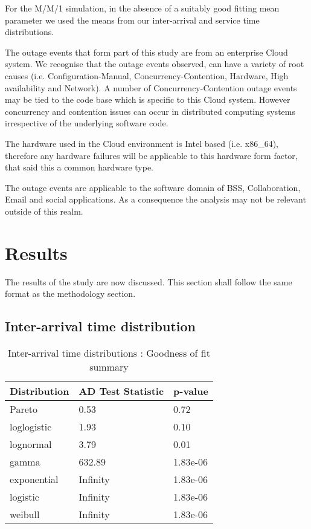 \documentclass[5p]{elsarticle}
\begin{document}
For the M/M/1 simulation, in the absence of a suitably good fitting mean parameter we used the means from our inter-arrival and service time distributions.

The outage events that form part of this study are from an enterprise Cloud system. We recognise that the outage events observed, can have a variety of root causes (i.e. Configuration-Manual, Concurrency-Contention, Hardware, High availability and Network). A number of Concurrency-Contention outage events may be tied to the code base which is specific to this Cloud system. However concurrency and contention issues can occur in distributed computing systems irrespective of the underlying software code.

The hardware used in the Cloud environment is Intel based (i.e. x86\_64), therefore any hardware failures will be applicable to this hardware form factor, that said this a common hardware type.

The outage events are applicable to the software domain of BSS, Collaboration, Email and social applications. As a consequence the analysis may not be relevant outside of this realm.

\section{Results}
The results of the study are now discussed. This section shall follow the same format as the methodology section.

\subsection{Inter-arrival time distribution}

\begin {table}
\caption {Inter-arrival time distributions :  Goodness of fit summary} 
\begin{center}
\begin{tabular}{p{2.1cm} |  p{3.1cm} | p{1.3cm}} \hline \bf{Distribution} & \bf{AD Test Statistic} & \bf{p-value}
\\ \hline Pareto & 0.53 & 0.72 
\\ loglogistic & 1.93 & 0.10
\\ lognormal & 3.79 & 0.01
\\ gamma & 632.89 & 1.83e-06	
\\ exponential & Infinity  & 1.83e-06
\\ logistic & Infinity & 1.83e-06	
\\ weibull  & Infinity & 1.83e-06 
\\ \hline
\end{tabular}
\end{center}
\end{table}
\end{document}
